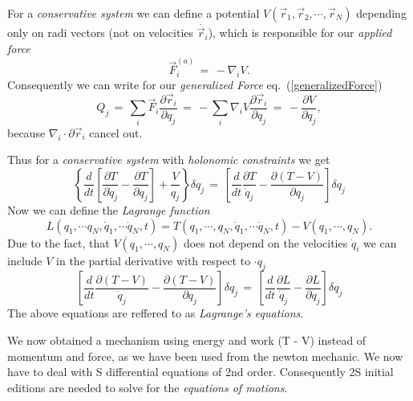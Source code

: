 For a \textit{conservative system} we can define a potential $V(\vec r_1, \vec
r_2, \cdots, \vec r_N)$ depending only on radi vectors (not on velocities
$\dot{\vec r_i}$), which is responsible for our \textit{applied force}
\begin{equation}
  \vec F_i^{(a)} \,=\, -\nabla_i V.
\end{equation}
Consequently we can write for our \textit{generalized Force}
eq.~(\ref{generalizedForce}) 
\begin{equation}
  Q_j \,=\, \sum_i \vec F_i \frac{\partial \vec r_i}{\partial q_j} \,=\,
- \sum_i \nabla_i V \frac{\partial \vec r_i}{\partial q_j} \,=\,
-\frac{\partial V}{\partial q_j}, 
\end{equation}
because $\nabla_i \cdot \partial \vec r_i$ cancel out.

Thus for a \textit{conservative system} with \textit{holonomic constraints} we
get
\begin{equation}
  \left\{ \frac{d}{dt} \left[\frac{\partial T}{\partial \dot q_j} - \frac{\partial
T}{\partial q_j} \right] + \frac{V}{q_j}\right\} \delta q_j \,=\, \left[
\frac{d}{dt} \frac{\partial T}{\dot q_j} - \frac{\partial (T - V)}{\partial
q_j} \right] \delta q_j 
\end{equation}
Now we can define the \textit{Lagrange function}
\begin{equation}
  L(q_1, \cdots q_N, \dot q_1, \cdots \dot q_N, t) = T(q_1, \cdots, q_N, \dot
q_1, \cdots \dot q_N, t) - V(q_1, \cdots, q_N).
\end{equation}
Due to the fact, that $V(q_1, \cdots, q_N)$ does not depend on the velocities $\dot
q_i$ we can include $V$ in the partial derivative with respect to $\cdot q_j$
\begin{equation}
\left[ \frac{d}{dt} \frac{\partial (T-V)}{\dot q_j} - \frac{\partial (T - V)}{\partial
q_j} \right] \delta q_j  \,=\, \left[ \frac{d}{dt} \frac{\partial L}{\dot q_j}
- \frac{\partial L}{\partial
q_j} \right] \delta q_j
\end{equation}
The above equations are reffered to as \textit{Lagrange's equations}.

We now obtained a mechanism using energy and work (T - V) instead of momentum
and force, as we have been used from the newton mechanic. We now have to deal
with S differential equations of 2nd order. Consequently 2S initial editions
are needed to solve for the \textit{equations of motions}.

